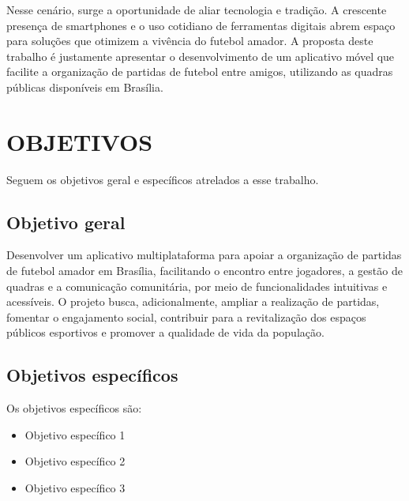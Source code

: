 Nesse cenário, surge a oportunidade de aliar tecnologia e tradição. A crescente presença de smartphones e o uso cotidiano de ferramentas digitais abrem espaço para soluções que otimizem a vivência do futebol amador. A proposta deste trabalho é justamente apresentar o desenvolvimento de um aplicativo móvel que facilite a organização de partidas de futebol entre amigos, utilizando as quadras públicas disponíveis em Brasília.

\section{OBJETIVOS}

Seguem os objetivos geral e específicos atrelados a esse trabalho.

\subsection{Objetivo geral}

Desenvolver um aplicativo multiplataforma para apoiar a organização de partidas de futebol amador em Brasília, facilitando o encontro entre jogadores, a gestão de quadras e a comunicação comunitária, por meio de funcionalidades intuitivas e acessíveis. O projeto busca, adicionalmente, ampliar a realização de partidas, fomentar o engajamento social, contribuir para a revitalização dos espaços públicos esportivos e promover a qualidade de vida da população.

\subsection{Objetivos específicos}

Os objetivos específicos são:

\begin{itemize}
    \item Objetivo específico 1
    \item Objetivo específico 2
    \item Objetivo específico 3
\end{itemize}
